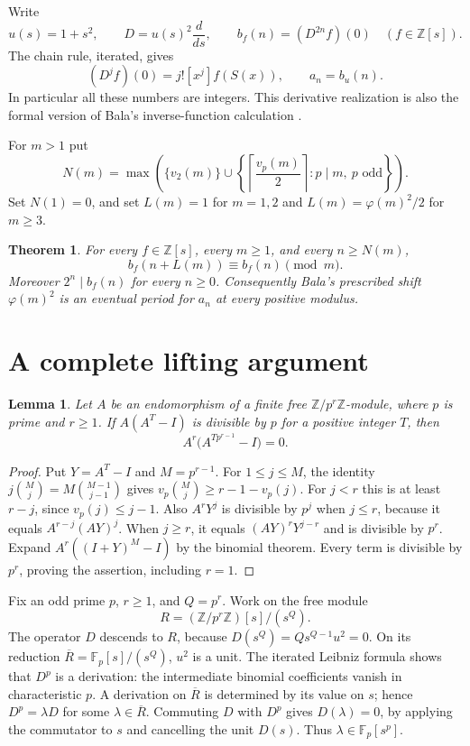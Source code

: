 \documentclass[11pt]{article}
\newtheorem{theorem}{Theorem}
\newtheorem{lemma}{Lemma}
\begin{document}
Write
\[
 u(s)=1+s^2,\qquad D=u(s)^2\frac{d}{ds},\qquad
 b_f(n)=(D^{2n}f)(0)\quad(f\in\mathbb Z[s]).
\]
The chain rule, iterated, gives
\begin{equation}\label{flow}
 (D^j f)(0)=j![x^j]f(S(x)),\qquad
 a_n=b_u(n).
\end{equation}
In particular all these numbers are integers. This derivative realization
is also the formal version of Bala's inverse-function calculation
\cite[Corollary 1]{bala}.

For $m>1$ put
\[
 N(m)=\max\left(\{v_2(m)\}\cup
 \left\{\left\lceil\frac{v_p(m)}2\right\rceil:
             p\mid m,\ p\text{ odd}\right\}\right).
\]
Set $N(1)=0$, and set $L(m)=1$ for $m=1,2$ and
$L(m)=\varphi(m)^2/2$ for $m\ge3$.

\begin{theorem}\label{main}
For every $f\in\mathbb Z[s]$, every $m\ge1$, and every $n\ge N(m)$,
\[
 b_f(n+L(m))\equiv b_f(n)\pmod m.
\]
Moreover $2^n\mid b_f(n)$ for every $n\ge0$.
Consequently Bala's prescribed shift $\varphi(m)^2$ is an eventual
period for $a_n$ at every positive modulus.
\end{theorem}

\section{A complete lifting argument}
\begin{lemma}\label{lift}
Let $A$ be an endomorphism of a finite free
$\mathbb Z/p^r\mathbb Z$-module, where $p$ is prime and $r\ge1$.
If $A(A^T-I)$ is divisible by $p$ for a positive integer $T$, then
\[
 A^r\bigl(A^{Tp^{r-1}}-I\bigr)=0.
\]
\end{lemma}
\begin{proof}
Put $Y=A^T-I$ and $M=p^{r-1}$. For $1\le j\le M$, the identity
$j\binom Mj=M\binom{M-1}{j-1}$ gives
$v_p\binom Mj\ge r-1-v_p(j)$. For $j<r$ this is at least $r-j$,
since $v_p(j)\le j-1$. Also $A^rY^j$ is divisible by $p^j$
when $j\le r$, because it equals $A^{r-j}(AY)^j$.
When $j\ge r$, it equals $(AY)^rY^{j-r}$ and is divisible by $p^r$.
Expand $A^r((I+Y)^M-I)$ by the binomial theorem. Every term
is divisible by $p^r$, proving the assertion, including $r=1$.
\end{proof}

Fix an odd prime $p$, $r\ge1$, and $Q=p^r$.
Work on the free module
\[
 R=(\mathbb Z/p^r\mathbb Z)[s]/(s^Q).
\]
The operator $D$ descends to $R$, because $D(s^Q)=Q s^{Q-1}u^2=0$.
On its reduction $\overline R=\mathbb F_p[s]/(s^Q)$, $u^2$ is a unit.
The iterated Leibniz formula shows that $D^p$ is a derivation: the
intermediate binomial coefficients vanish in characteristic $p$.
A derivation on $\overline R$ is determined by its value on $s$;
hence $D^p=\lambda D$ for some $\lambda\in\overline R$.
Commuting $D$ with $D^p$ gives $D(\lambda)=0$, by applying the
commutator to $s$ and cancelling the unit $D(s)$.
Thus $\lambda\in\mathbb F_p[s^p]$.
\end{document}
